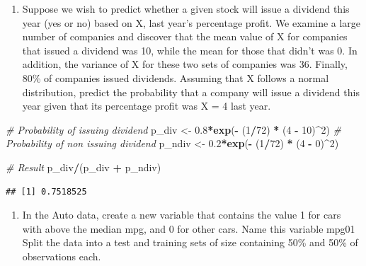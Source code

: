\documentclass[]{article}
\newenvironment{Shaded}{\begin{snugshade}}{\end{snugshade}}
\newcommand{\CommentTok}[1]{\textcolor[rgb]{0.56,0.35,0.01}{\textit{#1}}}
\newcommand{\DecValTok}[1]{\textcolor[rgb]{0.00,0.00,0.81}{#1}}
\newcommand{\FloatTok}[1]{\textcolor[rgb]{0.00,0.00,0.81}{#1}}
\newcommand{\KeywordTok}[1]{\textcolor[rgb]{0.13,0.29,0.53}{\textbf{#1}}}
\newcommand{\NormalTok}[1]{#1}
\newcommand{\OperatorTok}[1]{\textcolor[rgb]{0.81,0.36,0.00}{\textbf{#1}}}
\newcommand{\StringTok}[1]{\textcolor[rgb]{0.31,0.60,0.02}{#1}}
\providecommand{\tightlist}{%
  \setlength{\itemsep}{0pt}\setlength{\parskip}{0pt}}
\begin{document}
\begin{Shaded}
\end{Shaded}

\begin{enumerate}
\def\labelenumi{\arabic{enumi}.}
\setcounter{enumi}{1}
\tightlist
\item
  Suppose we wish to predict whether a given stock will issue a dividend
  this year (yes or no) based on X, last year's percentage profit. We
  examine a large number of companies and discover that the mean value
  of X for companies that issued a dividend was 10, while the mean for
  those that didn't was 0. In addition, the variance of X for these two
  sets of companies was 36. Finally, 80\% of companies issued dividends.
  Assuming that X follows a normal distribution, predict the probability
  that a company will issue a dividend this year given that its
  percentage profit was X = 4 last year.
\end{enumerate}

\begin{Shaded}
\begin{Highlighting}[]
\CommentTok{# Probability of issuing dividend }
\NormalTok{p_div <-}\StringTok{ }\FloatTok{0.8}\OperatorTok{*}\KeywordTok{exp}\NormalTok{(}\OperatorTok{-}\StringTok{ }\NormalTok{(}\DecValTok{1}\OperatorTok{/}\DecValTok{72}\NormalTok{) }\OperatorTok{*}\StringTok{ }\NormalTok{(}\DecValTok{4} \OperatorTok{-}\StringTok{ }\DecValTok{10}\NormalTok{)}\OperatorTok{^}\DecValTok{2}\NormalTok{)}
\CommentTok{# Probability of non issuing dividend }
\NormalTok{p_ndiv <-}\StringTok{ }\FloatTok{0.2}\OperatorTok{*}\KeywordTok{exp}\NormalTok{(}\OperatorTok{-}\StringTok{ }\NormalTok{(}\DecValTok{1}\OperatorTok{/}\DecValTok{72}\NormalTok{) }\OperatorTok{*}\StringTok{ }\NormalTok{(}\DecValTok{4} \OperatorTok{-}\StringTok{ }\DecValTok{0}\NormalTok{)}\OperatorTok{^}\DecValTok{2}\NormalTok{)}

\CommentTok{# Result}
\NormalTok{p_div}\OperatorTok{/}\NormalTok{(p_div }\OperatorTok{+}\StringTok{ }\NormalTok{p_ndiv)}
\end{Highlighting}
\end{Shaded}

\begin{verbatim}
## [1] 0.7518525
\end{verbatim}

\begin{enumerate}
\def\labelenumi{\arabic{enumi}.}
\setcounter{enumi}{2}
\tightlist
\item
  In the Auto data, create a new variable that contains the value 1 for
  cars with above the median mpg, and 0 for other cars. Name this
  variable mpg01 Split the data into a test and training sets of size
  containing 50\% and 50\% of observations each.
\end{enumerate}
\end{document}
